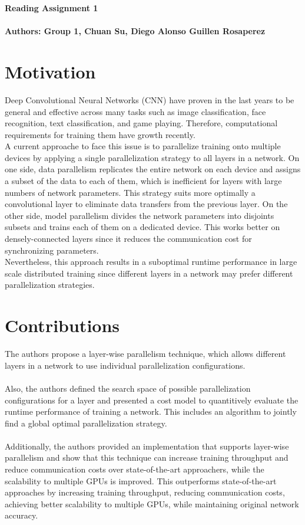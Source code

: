 \documentclass[10pt]{proc}
\begin{document}
\large{\textbf{Reading Assignment 1}}\\

\large{\textbf{\\Authors: Group 1, Chuan Su, Diego Alonso Guillen Rosaperez} }\\

\section{Motivation}
Deep Convolutional Neural Networks (CNN) have proven in the last years to be general and effective across many tasks such as image classification, face recognition, text classification, and game playing. Therefore, computational requirements for training them have growth recently.\\
A current approache to face this issue is to parallelize training onto multiple devices by applying a single parallelization strategy to all layers in a network. On one side, data parallelism replicates the entire network on each device and assigns a subset of the data to each of them, which is inefficient for layers with large numbers of network parameters. This strategy suits more optimally a convolutional layer to eliminate data transfers from the previous layer. On the other side, model parallelism divides the network parameters into disjoints subsets and trains each of them on a dedicated device. This works better on densely-connected layers since it reduces the communication cost for synchronizing parameters.\\
Nevertheless, this approach results in a suboptimal runtime performance in large scale distributed training since different layers in a network may prefer different parallelization strategies.

\section{Contributions}
The authors propose a layer-wise parallelism technique, which allows different layers in a network to use individual parallelization configurations.\\
\\
Also, the authors defined the search space of possible parallelization configurations for a layer and presented a cost model to quantitively evaluate the runtime performance of training a network. This includes an algorithm to jointly find a global optimal parallelization strategy.\\
\\
Additionally, the authors provided an implementation that supports layer-wise parallelism and show that this technique can increase training throughput and reduce communication costs over state-of-the-art approachers, while the scalability to multiple GPUs is improved. This outperforms state-of-the-art approaches by increasing training throughput, reducing communication costs, achieving better scalability to multiple GPUs, while maintaining original network accuracy.
\end{document}

